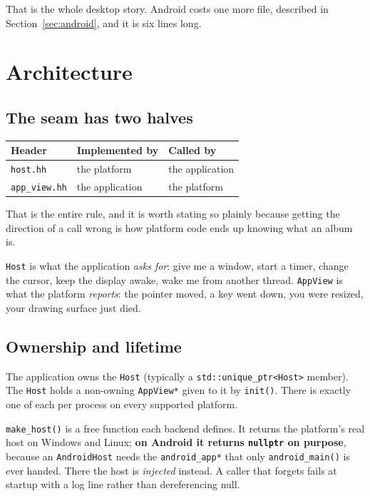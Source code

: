 \documentclass[11pt,a4paper]{article}
\begin{document}
That is the whole desktop story. Android costs one more file, described in
Section~\ref{sec:android}, and it is six lines long.

\section{Architecture}

\subsection{The seam has two halves}

\begin{center}
\begin{tabular}{@{}lll@{}}
\toprule
Header & Implemented by & Called by \\
\midrule
\texttt{host.hh}     & the platform     & the application \\
\texttt{app\_view.hh} & the application & the platform \\
\bottomrule
\end{tabular}
\end{center}

That is the entire rule, and it is worth stating so plainly because getting the
direction of a call wrong is how platform code ends up knowing what an album is.

\texttt{Host} is what the application \emph{asks for}: give me a window, start a
timer, change the cursor, keep the display awake, wake me from another thread.
\texttt{AppView} is what the platform \emph{reports}: the pointer moved, a key
went down, you were resized, your drawing surface just died.

\subsection{Ownership and lifetime}

The application owns the \texttt{Host} (typically a
\texttt{std::unique\_ptr<Host>} member). The \texttt{Host} holds a non-owning
\texttt{AppView*} given to it by \texttt{init()}. There is exactly one of each
per process on every supported platform.

\texttt{make\_host()} is a free function each backend defines. It returns the
platform's real host on Windows and Linux; \textbf{on Android it returns
\texttt{nullptr} on purpose}, because an \texttt{AndroidHost} needs the
\texttt{android\_app*} that only \texttt{android\_main()} is ever handed. There
the host is \emph{injected} instead. A caller that forgets fails at startup with
a log line rather than dereferencing null.
\end{document}
